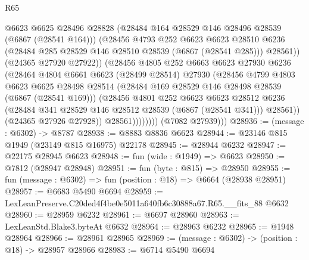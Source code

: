 \begin{lexlean}{R65}
\begin{coremodule}
{                          @6623
                          @6625
                          @28496
                          @28828
                          (@28484 @164 @28529 @146 @28496 @28539 (@6867 (@28541 @164)))
                          (@28456
                            @4793
                            @252
                            @6623
                            @6623
                            @28510
                            @6236
                            (@28484 @285 @28529 @146 @28510 @28539 (@6867 (@28541 @285)))
                            @28561))
                        (@24365 @27920 @27922))
                      (@28456
                        @4805
                        @252
                        @6663
                        @6623
                        @27930
                        @6236
                        (@28464
                          @4804
                          @6661
                          @6623
                          (@28499 @28514)
                          @27930
                          (@28456
                            @4799
                            @4803
                            @6623
                            @6625
                            @28498
                            @28514
                            (@28484 @169 @28529 @146 @28498 @28539 (@6867 (@28541 @169)))
                            (@28456
                              @4801
                              @252
                              @6623
                              @6623
                              @28512
                              @6236
                              (@28484 @341 @28529 @146 @28512 @28539 (@6867 (@28541 @341)))
                              @28561))
                          (@24365 @27926 @27928))
                        @28561))))))))
        (@7082 @27939)))
@28936 := (message : @6302) -> @8787
@28938 := @8883 @8836 @6623
@28944 := @23146 @815 @1949 (@23149 @815 @16975) @22178
@28945 := @28944 @6232
@28947 := @22175 @28945 @6623
@28948 := fun (wide : @1949) => @6623
@28950 := @7812 (@28947 @28948)
@28951 := fun (byte : @815) => @28950
@28955 := fun (message : @6302) => fun (position : @18) => @6664 (@28938 @28951)
@28957 := @6683 @5490 @6694
@28959 := LexLeanPreserve.C20ded4f4be0e5011a640fb6c30888a67.R65.__fits_88 @6632
@28960 := @28959 @6232
@28961 := @6697 @28960
@28963 := LexLeanStd.Blake3.byteAt @6632
@28964 := @28963 @6232
@28965 := @1948 @28964
@28966 := @28961 @28965
@28969 := (message : @6302) -> (position : @18) -> @28957 @28966
@28983 := @6714
    @5490
    @6694
}
\end{coremodule}
\end{lexlean}
